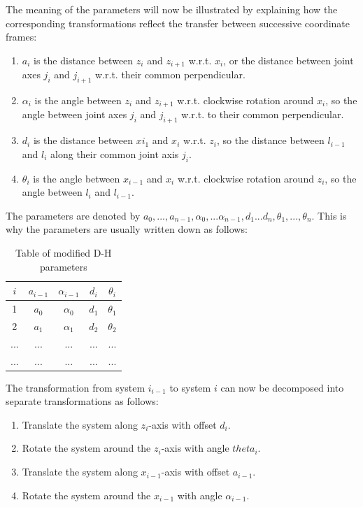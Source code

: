 \documentclass[pdftex,11pt,a4paper]{report}
\begin{document}
The meaning of the parameters will now be illustrated by explaining how the corresponding transformations reflect the transfer between successive coordinate frames:
\begin{enumerate}
\item $a_i$ is the distance between $z_i$ and $z_{i+1}$ w.r.t. $x_i$, or the distance between joint axes $j_i$ and $j_{i+1}$ w.r.t. their common perpendicular.
\item $\alpha_i$ is the angle between $z_i$ and $z_{i+1}$ w.r.t. clockwise rotation around $x_i$, so the angle between joint axes $j_i$ and $j_{i+1}$ w.r.t. to their common perpendicular.
\item $d_i$ is the distance between $x{i_1}$ and $x_i$ w.r.t. $z_i$, so the distance between $l_{i-1}$ and $l_i$ along their common joint axis $j_i$.
\item $\theta_i$ is the angle between $x_{i-1}$ and $x_i$ w.r.t. clockwise rotation around $z_i$, so the angle between $l_i$ and $l_{i-1}$.
\end{enumerate}

The parameters are denoted by $a_0, ... , a_{n-1}, \alpha_0, ... \alpha_{n-1}, d_1 ... d_n, \theta_1, ... , \theta_n$. This is why the parameters are usually written down as follows:

\begin{table}[htbp]
  \centering
  \begin{tabular}{@{} ccccc @{}}
    \hline
    $i$ & $a_{i-1}$ & $\alpha_{i-1}$ & $d_i$ & $\theta_i$ \\ 
    \hline
    1 & $a_0$ & $\alpha_0$ & $d_1$ & $\theta_1$ \\ 
    2 & $a_1$ & $\alpha_1$ & $d_2$ & $\theta_2$ \\ 
    ... & ... & ... & ... & ... \\ 
   ... & ... & ... & ... & ... \\ 
    \hline
  \end{tabular}
  \caption{Table of modified D-H parameters}
  \label{tab:label}
\end{table}

The transformation from system $i_{i-1}$ to system $i$ can now be decomposed into separate transformations as follows:
\begin{enumerate}
\item Translate the system along $z_i$-axis with offset $d_i$.
\item Rotate the system around the $z_i$-axis with angle $theta_i$.
\item Translate the system along $x_{i-1}$-axis with offset $a_{i-1}$.
\item Rotate the system around the $x_{i-1}$ with angle $\alpha_{i-1}$.
\end{enumerate}
\end{document}
